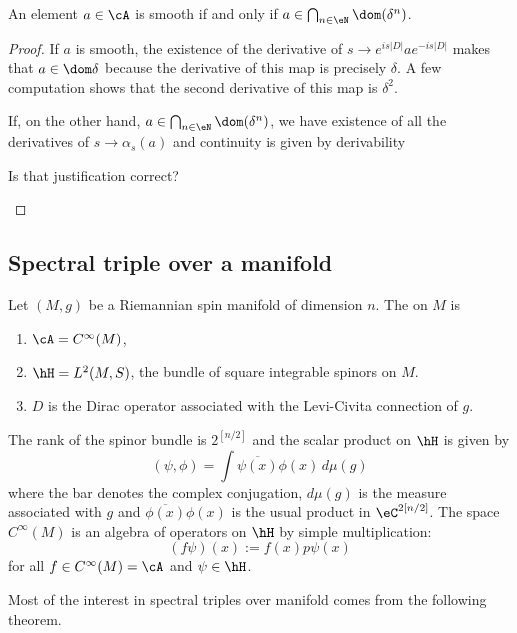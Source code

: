 \begin{proposition}
	An element $a\in\cA$ is smooth if and only if $a\in\bigcap_{n\in\eN}\dom(\delta^n)$.
\end{proposition}

\begin{proof}
	If $a$ is smooth, the existence of the derivative of $s\to  e^{is| D |}a e^{-is| D |}$ makes that $a\in\dom\delta$ because the derivative of this map is precisely $\delta$. A few computation shows that the second derivative of this map is $\delta^2$.

	If, on the other hand, $a\in\bigcap_{n\in\eN}\dom(\delta^n)$, we have existence of all the derivatives of $s\to\alpha_s(a)$ and continuity is given by derivability
	\begin{probleme}
		Is that justification correct?
	\end{probleme}

\end{proof}

\subsection{Spectral triple over a manifold}

Let $(M,g)$ be a Riemannian spin manifold of dimension $n$. The  on $M$ is
\begin{enumerate}
	\item $\cA= C^{\infty}(M)$,
	\item $\hH=L^2(M,S)$, the bundle of square integrable spinors on $M$.
	\item $D$ is the Dirac operator associated with the Levi-Civita connection of $g$.
\end{enumerate}
The rank of the spinor bundle is $2^{[n/2]}$ and the scalar product on $\hH$ is given by
\[
	(\psi,\phi)=\int \overline{ \psi(x) }\phi(x)\,d\mu(g)
\]
where the bar denotes the complex conjugation, $d\mu(g)$ is the measure associated with $g$ and $\overline{ \phi(x) }\phi(x)$ is the usual product in $\eC^{2[n/2]}$. The space $ C^{\infty}(M)$ is an algebra of operators on $\hH$ by simple multiplication:
\begin{equation}
	(f\psi)(x):=f(x)p\psi(x)
\end{equation}
for all $f\in C^{\infty}(M)=\cA$ and $\psi\in\hH$.

Most of the interest in spectral triples over manifold comes from the following theorem.

